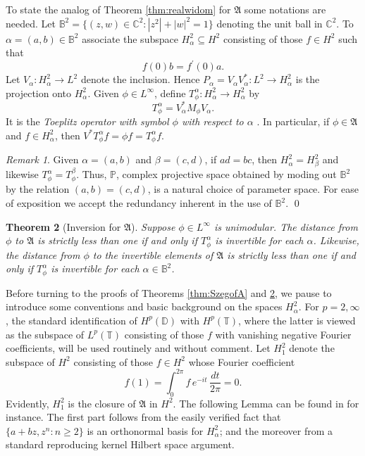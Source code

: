 \documentclass[12pt]{amsart}
\newtheorem{theorem}{Theorem}[section]
\theoremstyle{definition}
\theoremstyle{remark}
\newtheorem{remark}[theorem]{Remark}
\numberwithin{equation}{section}
\begin{document}
   
To state the analog of Theorem \ref{thm:realwidom} for ${\mathfrak{A}}$ some notations are needed. 
Let ${\mathbb{B}^2}=\{(z,w)\in {\mathbb C}^2 : |z^2|+|w|^2=1\}$ denoting the unit ball in ${\mathbb C}^2.$
To $\alpha=(a,b)\in {\mathbb{B}^2}$ associate the subspace $H^2_\alpha {\subseteq} H^2$ consisting of those $f\in H^2$ such that
\[
 f(0)b= f^\prime(0)a.
\]
Let $V_\alpha:H^2_\alpha\to L^2$ denote the inclusion. Hence $P_\alpha= V_\alpha V_\alpha^*:L^2\to H^2_\alpha$ is the projection onto $H^2_\alpha$. 
Given $\phi\in L^\infty$, 
define $T_\phi^\alpha:H^2_\alpha\to H^2_\alpha$ by 
\[
 T_\phi^\alpha = V_\alpha^* M_\phi V_\alpha.
\]
It is the {{\it{{Toeplitz operator with symbol $\phi$ with respect to $\alpha$}}}{}} \cite{adam}. 
In particular, if $\phi \in {\mathfrak{A}}$ and $f\in H^2_\alpha$,  then $V^* T^\alpha_\phi f = \phi f=T^\alpha_\phi f.$

\begin{remark}\rm
\label{rem:PP}
Given $\alpha =(a,b)$ and $\beta=(c,d)$, if $ad=bc$, then $H^2_\alpha =H^2_\beta$ and likewise
$T^\alpha_\phi=T^\beta_\phi$. Thus, $\mathbb P$, complex projective space obtained by moding out ${\mathbb{B}^2}$ by the relation $(a,b)=(c,d)$,
is a natural choice of parameter space. For ease of exposition we accept the redundancy inherent in the use of ${\mathbb{B}^2}$. \qed
\end{remark}

\begin{theorem}[Inversion for ${\mathfrak{A}}$]
\label{thm:widomfA}
 Suppose $\phi\in L^\infty$ is unimodular.
The distance from $\phi$ to ${\mathfrak{A}}$ is strictly less than one if and only if 
$T^\alpha_\phi$ is invertible for each $\alpha$. Likewise, the distance from $\phi$ to the invertible elements of ${\mathfrak{A}}$ is strictly less than one if and only
if $T^\alpha_\phi$ is invertible for each $\alpha\in {\mathbb{B}^2}$.
\end{theorem}

Before turning to the proofs of Theorems \ref{thm:SzegofA} and \ref{thm:widomfA}, we pause to introduce some conventions
and basic background on the spaces $H^2_\alpha.$ 
For $p=2,\infty$,
the standard identification of $H^p({\mathbb D})$ with $H^p({\mathbb T})$, where the latter is viewed as the subspace of $L^p({\mathbb T})$ consisting
of those $f$ with vanishing negative Fourier coefficients, will be used routinely and without comment.
Let $H^2_1$ denote the subspace of $H^2$ consisting of those  $f\in H^2$ whose Fourier coefficient
\[
 \hat{f}(1) = {\int_{0}^{2\pi}} f\, e^{-it} \, {\frac{dt}{2\pi}} = 0.
\]
Evidently, $H^2_1$ is the closure of ${\mathfrak{A}}$ in $H^2$. 
  
The following Lemma can be found in \cite{DPRS} for instance.
The first part follows from the easily 
verified fact that $\{a+bz,z^n:n\ge 2\}$ is an orthonormal basis for $H^2_\alpha$;
and the moreover from a standard reproducing kernel Hilbert space argument.
\end{document}
